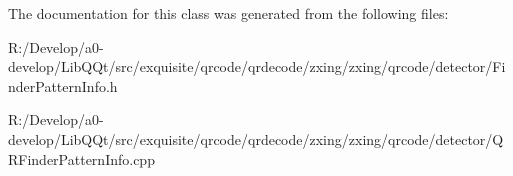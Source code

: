 The documentation for this class was generated from the following files\+:\begin{DoxyCompactItemize}
\item 
R\+:/\+Develop/a0-\/develop/\+Lib\+Q\+Qt/src/exquisite/qrcode/qrdecode/zxing/zxing/qrcode/detector/Finder\+Pattern\+Info.\+h\item 
R\+:/\+Develop/a0-\/develop/\+Lib\+Q\+Qt/src/exquisite/qrcode/qrdecode/zxing/zxing/qrcode/detector/Q\+R\+Finder\+Pattern\+Info.\+cpp\end{DoxyCompactItemize}
